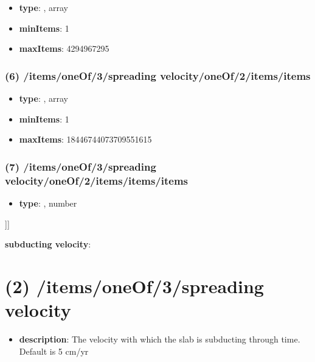 \begin{itemize}[leftmargin=5em]\item {\bf type}: , array\item {\bf minItems}: 1
\item {\bf maxItems}: 4294967295
\end{itemize}\subsubsection{(6) /items/oneOf/3/spreading velocity/oneOf/2/items/items}
\begin{itemize}[leftmargin=6em]\item {\bf type}: , array\item {\bf minItems}: 1
\item {\bf maxItems}: 18446744073709551615
\end{itemize}\subsubsection{(7) /items/oneOf/3/spreading velocity/oneOf/2/items/items/items}
\begin{itemize}[leftmargin=7em]\item {\bf type}: , number\end{itemize}]]\item {\bf subducting velocity}: \section{(2) /items/oneOf/3/spreading velocity}
\begin{itemize}[leftmargin=2em]\item {\bf description}: The velocity with which the slab is subducting through time. Default is 5 cm/yr
\end{itemize}
